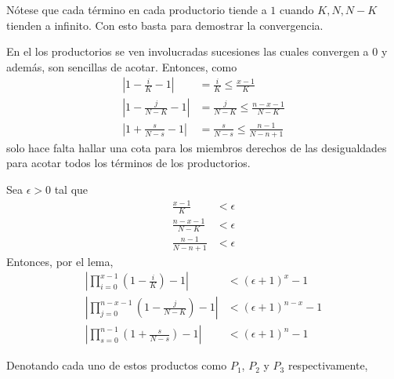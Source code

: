 \begin{Demo}
  Nótese que cada término en cada productorio tiende a $1$ cuando $K,N,N-K$
  tienden a infinito. Con esto basta para demostrar la convergencia.

  En el los productorios se ven involucradas sucesiones las cuales convergen
  a $0$ y además, son sencillas de acotar. Entonces, como
  \begin{align*}
    \left|1 - \frac{i}{K} - 1\right| &= \frac{i}{K} \leq \frac{x-1}{K}\\[10pt]
    \left|1 - \frac{j}{N-K} - 1\right| &= \frac{j}{N-K} \leq \frac{n-x-1}{N-K}\\[10pt]
    \left|1 + \frac{s}{N-s} - 1\right| &= \frac{s}{N-s} \leq \frac{n-1}{N-n+1}
  \end{align*}
  solo hace falta hallar una cota para los miembros derechos de las desigualdades para
  acotar todos los términos de los productorios.

  Sea $\epsilon>0$ tal que
  \begin{align*}
    \frac{x-1}{K}     &< \epsilon\\
    \frac{n-x-1}{N-K} &< \epsilon\\
    \frac{n-1}{N-n+1} &< \epsilon
  \end{align*}
  Entonces, por el lema,
  \begin{align*}
    \left|\prod_{i=0}^{x-1}\left(1-\frac{i}{K}\right) - 1\right| 
    &< (\epsilon + 1)^x - 1\\[10pt]
    \left|\prod_{j=0}^{n-x-1}\left(1 - \frac{j}{N-K}\right) - 1\right|
    &< (\epsilon + 1)^{n-x} - 1\\[10pt]
    \left|\prod_{s=0}^{n-1}\left(1 + \frac{s}{N-s}\right) - 1\right|
    &< (\epsilon + 1)^n - 1
  \end{align*}

  Denotando cada uno de estos productos como $P_1$, $P_2$ y $P_3$ respectivamente,


\end{Demo}
